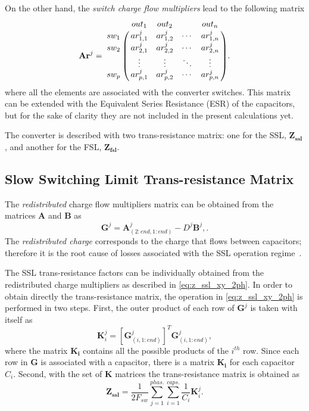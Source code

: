 On the other hand, the \emph{switch charge flow multipliers} lead to the following matrix
\begin{equation}
 \mathbf{Ar}^j =
   \bordermatrix { ~ & out_1 & out_2 & ~ & out_n \cr
     sw_1  & ar_{1,1}^j  & ar_{1,2}^j & \cdots & ar_{1,n}^j \cr
     sw_2  & ar_{2,1}^j  & ar_{2,2}^j & \cdots & ar_{2,n}^j \cr
      ~    & \vdots     & \vdots & \ddots & \vdots \cr
     sw_p  & ar_{p,1}^j  & ar_{p,2}^j & \cdots & ar_{p,n}^j \cr}.
 \label{eq:A_matrix}
\end{equation}
where all the elements are associated with the converter switches. This matrix can be extended with the Equivalent Series Resistance (ESR) of the capacitors, but for the sake of clarity they are not included in the present calculations yet.

 The converter is described with two trans-resistance matrix: one for the SSL, $\mathbf{Z_{ssl}}$, and another for the FSL, $\mathbf{Z_{fsl}}$.

\subsection{Slow Switching Limit Trans-resistance Matrix}

The \emph{redistributed} charge flow multipliers matrix can be obtained from the
matrices $\mathbf{A}$ and $\mathbf{B}$  as
\begin{equation}
 \mathbf{G}^j = \mathbf{A}_{(2:end,1:end)}^j - D^j \mathbf{B}^j,
 \label{eq:R_matrix}.
\end{equation}
The \emph{redistributed charge} corresponds to the charge that flows between capacitors; therefore it is the root cause of
losses associated with the SSL operation regime~\cite{Seeman:EECS-2009-78}.

The SSL trans-resistance factors can be individually obtained from the redistributed charge multipliers as described in \eqref{eq:z_ssl_xy_2ph}. In order to obtain directly the trans-resistance matrix, the operation in \eqref{eq:z_ssl_xy_2ph} is performed in  two steps. First, the outer product of  each row of $\mathbf{G}^j$ is taken with itself as
\begin{equation}
 \mathbf{K}_i^j =[\mathbf{G}_{(i,1:end)}^j ]^T \mathbf{G}_{(i,1:end)}^j ,
 \label{eq:K_matrix}
\end{equation}
where the matrix $\mathbf{K_i}$ contains all the possible products of the  $i^{th}$ row. Since each row in $\mathbf{G}$ is associated with a capacitor, there is a matrix $\mathbf{K_i}$ for each capacitor $C_i$.
Second, with the set of $\mathbf{K}$ matrices the trans-resistance matrix is obtained as
\begin{equation}
 \mathbf{Z_{ssl}} = \frac{1}{2 F_{sw}} \sum_{j=1}^{phas.} \sum_{i=1}^{caps.} \frac{1}{C_i} \mathbf{K}_i^j.
 \label{eq:G_ssl}
\end{equation}

